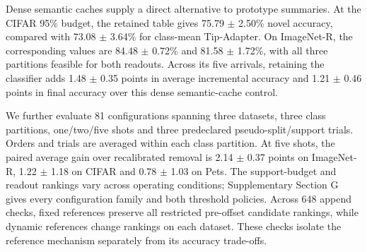 Dense semantic caches supply a direct alternative to prototype summaries. At the CIFAR 95\% budget, the retained table gives 75.79 $\pm$ 2.50\% novel accuracy, compared with 73.08 $\pm$ 3.64\% for class-mean Tip-Adapter. On ImageNet-R, the corresponding values are 84.48 $\pm$ 0.72\% and 81.58 $\pm$ 1.72\%, with all three partitions feasible for both readouts. Across its five arrivals, retaining the classifier adds 1.48 $\pm$ 0.35 points in average incremental accuracy and 1.21 $\pm$ 0.46 points in final accuracy over this dense semantic-cache control.

We further evaluate 81 configurations spanning three datasets, three class partitions, one/two/five shots and three predeclared pseudo-split/support trials. Orders and trials are averaged within each class partition. At five shots, the paired average gain over recalibrated removal is 2.14 $\pm$ 0.37 points on ImageNet-R, 1.22 $\pm$ 1.18 on CIFAR and 0.78 $\pm$ 1.03 on Pets. The support-budget and readout rankings vary across operating conditions; Supplementary Section G gives every configuration family and both threshold policies. Across 648 append checks, fixed references preserve all restricted pre-offset candidate rankings, while dynamic references change rankings on each dataset. These checks isolate the reference mechanism separately from its accuracy trade-offs.

